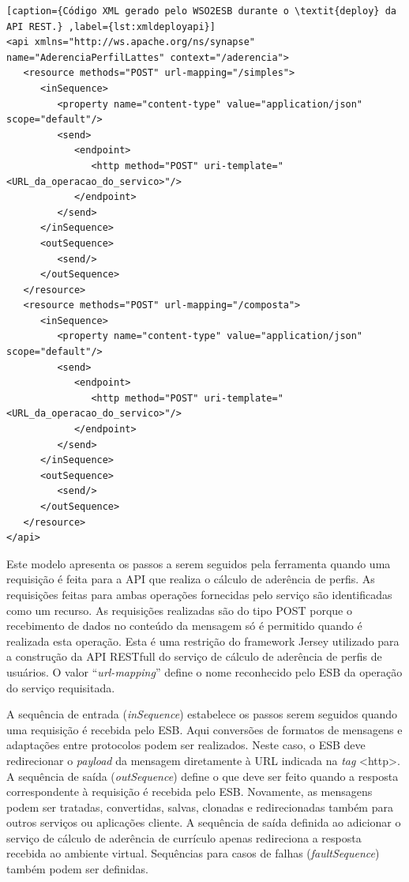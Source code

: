 \begin{lstlisting}[caption={Código XML gerado pelo WSO2ESB durante o \textit{deploy} da API REST.} ,label={lst:xmldeployapi}]
<api xmlns="http://ws.apache.org/ns/synapse" name="AderenciaPerfilLattes" context="/aderencia">
   <resource methods="POST" url-mapping="/simples">
      <inSequence>
         <property name="content-type" value="application/json" scope="default"/>
         <send>
            <endpoint>
               <http method="POST" uri-template="<URL_da_operacao_do_servico>"/>
            </endpoint>
         </send>
      </inSequence>
      <outSequence>
         <send/>
      </outSequence>
   </resource>
   <resource methods="POST" url-mapping="/composta">
      <inSequence>
         <property name="content-type" value="application/json" scope="default"/>
         <send>
            <endpoint>
               <http method="POST" uri-template="<URL_da_operacao_do_servico>"/>
            </endpoint>
         </send>
      </inSequence>
      <outSequence>
         <send/>
      </outSequence>
   </resource>
</api>
\end{lstlisting}

Este modelo apresenta os passos a serem seguidos pela ferramenta quando uma requisição é feita para a API que realiza o cálculo de aderência de perfis. As requisições feitas para ambas operações fornecidas pelo serviço são identificadas como um recurso. As requisições realizadas são do tipo POST porque o recebimento de dados no conteúdo da mensagem só é permitido quando é realizada esta operação. Esta é uma restrição do framework Jersey utilizado para a construção da API RESTfull do serviço de cálculo de aderência de perfis de usuários. O valor “\textit{url-mapping}” define o nome reconhecido pelo ESB da operação do serviço requisitada.

A sequência de entrada (\textit{inSequence}) estabelece os passos serem seguidos quando uma requisição é recebida pelo ESB. Aqui conversões de formatos de mensagens e adaptações entre protocolos podem ser realizados. Neste caso, o ESB deve redirecionar o \textit{payload} da mensagem diretamente à URL indicada na \textit{tag} <http>. A sequência de saída (\textit{outSequence}) define o que deve ser feito quando a resposta correspondente à requisição é recebida pelo ESB. Novamente, as mensagens podem ser tratadas, convertidas, salvas, clonadas e redirecionadas também para outros serviços ou aplicações cliente. A sequência de saída definida ao adicionar o serviço de cálculo de aderência de currículo apenas redireciona a resposta recebida ao ambiente virtual. Sequências para casos de falhas (\textit{faultSequence}) também podem ser definidas.

